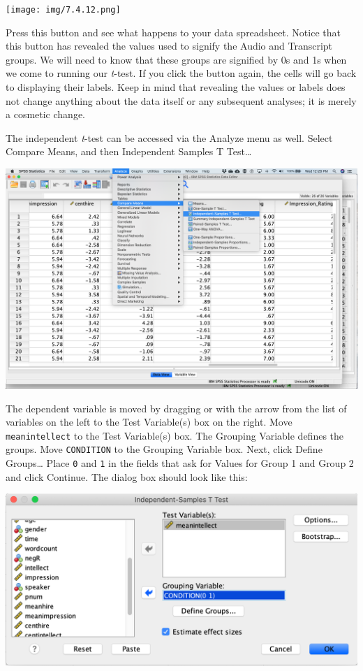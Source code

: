 \documentclass[
]{book}
\begin{document}
\texttt{[image: img/7.4.12.png]}

Press this button and see what happens to your data spreadsheet. Notice that this button has revealed the values used to signify the Audio and Transcript groups. We will need to know that these groups are signified by 0s and 1s when we come to running our \emph{t}-test. If you click the button again, the cells will go back to displaying their labels. Keep in mind that revealing the values or labels does not change anything about the data itself or any subsequent analyses; it is merely a cosmetic change.

The independent \emph{t}-test can be accessed via the {Analyze} menu as well. Select {Compare Means}, and then {Independent Samples T Test\ldots{}}

\includegraphics{img/12.2.5.png}

The dependent variable is moved by dragging or with the arrow from the list of variables on the left to the {Test Variable(s)} box on the right. Move \texttt{meanintellect} to the {Test Variable(s)} box. The {Grouping Variable} defines the groups. Move \texttt{CONDITION} to the {Grouping Variable} box. Next, click {Define Groups\ldots{}} Place \texttt{0} and \texttt{1} in the fields that ask for Values for Group 1 and Group 2 and click {Continue}. The dialog box should look like this:

\includegraphics{img/12.2.6.png}
\end{document}
